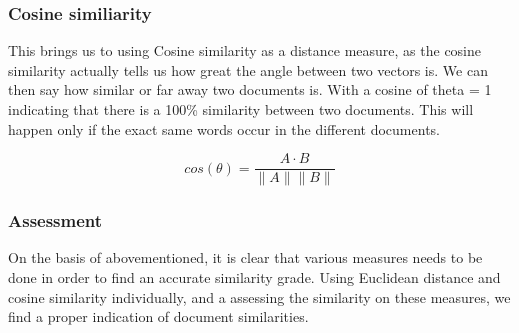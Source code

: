 \documentclass[11pt]{article}
\begin{document}
\subsubsection{Cosine similiarity}\label{cosine-similiarity}

This brings us to using Cosine similarity as a distance measure, as the
cosine similarity actually tells us how great the angle between two
vectors is. We can then say how similar or far away two documents is.
With a cosine of theta = 1 indicating that there is a 100\% similarity
between two documents. This will happen only if the exact same words
occur in the different documents.

\[ cos(\theta) = \frac{A \cdot B} {\| A \| \| B \|} \]

\subsubsection{Assessment}\label{assessment}

On the basis of abovementioned, it is clear that various measures needs
to be done in order to find an accurate similarity grade. Using
Euclidean distance and cosine similarity individually, and a assessing
the similarity on these measures, we find a proper indication of
document similarities.


    
    
    
    
\end{document}
